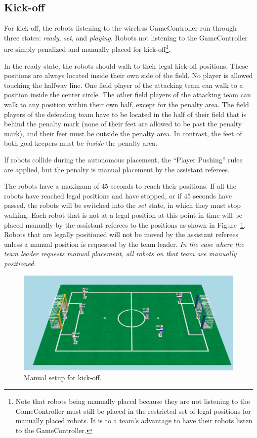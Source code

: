 \documentclass[12pt]{article}
\newcommand{\KickOffAutoTime}{45 seconds\xspace}
\begin{document}
\subsection{Kick-off}
\label{sec:kick-off}

For kick-off, the robots listening to the wireless GameController run through three states: \emph{ready}, \emph{set}, and \emph{playing}. Robots not listening to the GameController are simply penalized and manually placed for kick-off\footnote{Note that robots being manually placed because they are not listening to the GameController must still be placed in the restricted set of legal positions for manually placed robots. It is to a team's advantage to have their robots listen to the GameController.}.

In the ready state, the robots should walk to their legal kick-off positions. These positions are always located inside their own side of the field. No player is allowed touching the halfway line.
One field player of the attacking team can walk to a position inside the center circle.
The other field players of the attacking team can walk to any position within their own half, except for the penalty area.
The field players of the defending team have to be located in the half of their field that is behind the penalty mark (none of their feet are allowed to be past the penalty mark), and their feet must be outside the penalty area.
In contrast, the feet of both goal keepers must be \emph{inside} the penalty area.

If robots collide during the autonomous placement, the ``Player Pushing'' rules are applied, but the penalty is manual placement by the assistant referees.

The robots have a maximum of \KickOffAutoTime to reach their positions. If all the robots have reached legal positions and have stopped, or if \KickOffAutoTime have passed, the robots will be switched into the \emph{set} state, in which they must stop walking. Each robot that is not at a legal position at this point in time will be placed manually by the assistant referees to the positions as shown in Figure~\ref{fig:ko}. Robots that are legally positioned will not be moved by the assistant referees unless a manual position is requested by the team leader.
\emph{In the case where the team leader requests manual placement, all robots on that team are manually positioned.}


\begin{figure}[t]
\centerline{\includegraphics[width=\columnwidth]{figs/manual_placement_2011.png}}
\caption{Manual setup for kick-off.}
\label{fig:ko}
\end{figure}
\end{document}
